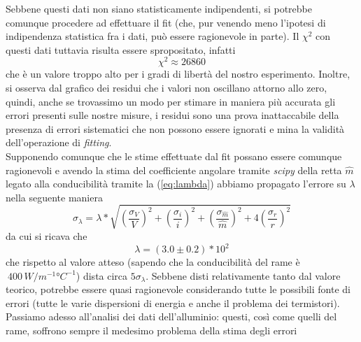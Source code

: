 \documentclass{article}
\begin{document}
Sebbene questi dati non siano statisticamente indipendenti, si potrebbe comunque procedere ad effettuare il fit (che, pur venendo meno l'ipotesi di indipendenza statistica fra i dati, può essere ragionevole in parte). Il $\chi^2$ con questi dati tuttavia risulta essere spropositato, infatti
\begin{equation*}
	\chi^2 \approx 26860
\end{equation*}
che è un valore troppo alto per i gradi di libertà del nostro esperimento. Inoltre, si osserva dal grafico dei residui che i valori non oscillano attorno allo zero, quindi, anche se trovassimo un modo per stimare in maniera più accurata gli errori presenti sulle nostre misure, i residui sono una prova inattaccabile della presenza di errori sistematici che non possono essere ignorati e mina la validità dell'operazione di \emph{fitting}. \\
Supponendo comunque che le stime effettuate dal fit possano essere comunque ragionevoli e avendo la stima del coefficiente angolare tramite \emph{scipy} della retta $\hat{m}$ legato alla conducibilità tramite la (\ref{eq:lambda}) abbiamo propagato l'errore su $\lambda$ nella seguente maniera
\begin{equation*}
	\sigma_\lambda = \lambda * \sqrt{ \left( \frac{\sigma_V}{V} \right)^2 + \left( \frac{\sigma_i}{i} \right)^2 + \left( \frac{\sigma_{\hat{m}}}{\hat{m}} \right)^2 + 4 \left(\frac{\sigma_r}{r} \right)^2} 
\end{equation*}
da cui si ricava che
\begin{equation*}
	\lambda = (3.0 \pm 0.2) * 10^2
\end{equation*}
che rispetto al valore atteso (sapendo che la conducibilità del rame è $~400 \, \unit{W/m^{-1}°C^{-1}}$) dista circa $5\sigma_{\lambda}$. Sebbene disti relativamente tanto dal valore teorico, potrebbe essere quasi ragionevole considerando tutte le possibili fonte di errori (tutte le varie dispersioni di energia e anche il problema dei termistori). \\
Passiamo adesso all'analisi dei dati dell'alluminio: questi, così come quelli del rame, soffrono sempre il medesimo problema della stima degli errori
\end{document}
